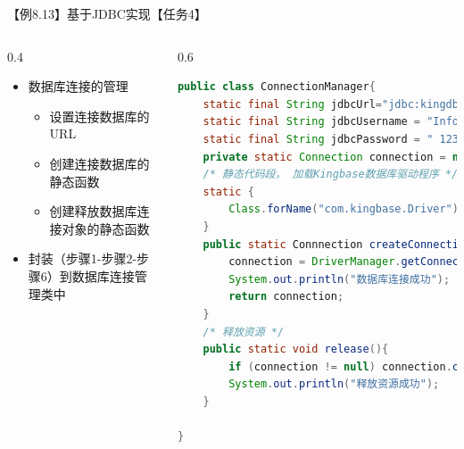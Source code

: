 \begin{frame}{【例8.13】基于JDBC实现【任务4】}
\begin{columns}
\begin{column}{0.4\textwidth}
\vspace{-2ex}
\begin{itemize}
    \item 数据库连接的管理
    \begin{itemize}
        \item 设置连接数据库的URL
        \item 创建连接数据库的静态函数
        \item 创建释放数据库连接对象的静态函数
    \end{itemize}
    \item 封装（步骤1-步骤2-步骤6）到数据库连接管理类中
\end{itemize}
\end{column}

\begin{column}{0.6\textwidth}
\vspace{-4ex}
\begin{block}{}
\begin{lstlisting}[language=Java, linewidth=\textwidth, basicstyle=\ttfamily\tiny]
public class ConnectionManager{
    static final String jdbcUrl="jdbc:kingdb://192.168.0.118:54321/DB-Student";
    static final String jdbcUsername = "Info001";
    static final String jdbcPassword = " 123456";
    private static Connection connection = null;
    /* 静态代码段， 加载Kingbase数据库驱动程序 */
    static {
        Class.forName("com.kingbase.Driver");
    }
    public static Connnection createConnection(){
        connection = DriverManager.getConnection(jdbcUrl, jdbcUsername, jdbcPassword);
        System.out.println("数据库连接成功");
        return connection;
    }
    /* 释放资源 */
    public static void release(){
        if (connection != null) connection.close();
        System.out.println("释放资源成功");
    }

}
\end{lstlisting}
\end{block}
\end{column}

\end{columns}
\end{frame}


